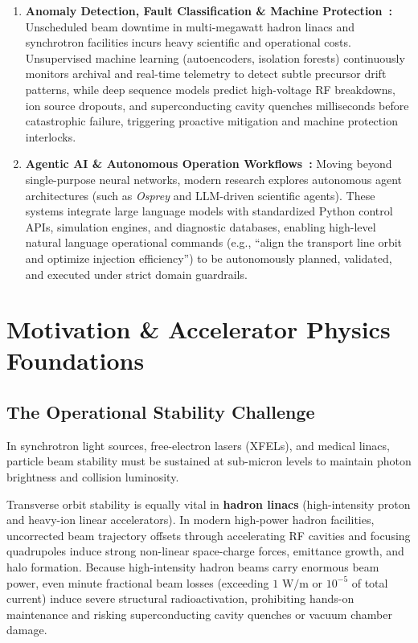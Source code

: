 \documentclass[11pt,a4paper]{article}
\begin{document}
\begin{enumerate}
    \item \textbf{Anomaly Detection, Fault Classification \& Machine Protection~\cite{tennant2020supervised}:}
    Unscheduled beam downtime in multi-megawatt hadron linacs and synchrotron facilities incurs heavy scientific and operational costs. Unsupervised machine learning (autoencoders, isolation forests) continuously monitors archival and real-time telemetry to detect subtle precursor drift patterns, while deep sequence models predict high-voltage RF breakdowns, ion source dropouts, and superconducting cavity quenches milliseconds before catastrophic failure, triggering proactive mitigation and machine protection interlocks.

    \item \textbf{Agentic AI \& Autonomous Operation Workflows~\cite{hellert2024autonomous}:}
    Moving beyond single-purpose neural networks, modern research explores autonomous agent architectures (such as \textit{Osprey} and LLM-driven scientific agents). These systems integrate large language models with standardized Python control APIs, simulation engines, and diagnostic databases, enabling high-level natural language operational commands (e.g., ``align the transport line orbit and optimize injection efficiency'') to be autonomously planned, validated, and executed under strict domain guardrails.
\end{enumerate}


\section{Motivation \& Accelerator Physics Foundations}

\subsection{The Operational Stability Challenge}
In synchrotron light sources, free-electron lasers (XFELs), and medical linacs, particle beam stability must be sustained at sub-micron levels to maintain photon brightness and collision luminosity. 

Transverse orbit stability is equally vital in \textbf{hadron linacs} (high-intensity proton and heavy-ion linear accelerators). In modern high-power hadron facilities, uncorrected beam trajectory offsets through accelerating RF cavities and focusing quadrupoles induce strong non-linear space-charge forces, emittance growth, and halo formation. Because high-intensity hadron beams carry enormous beam power, even minute fractional beam losses (exceeding $1\text{ W/m}$ or $10^{-5}$ of total current) induce severe structural radioactivation, prohibiting hands-on maintenance and risking superconducting cavity quenches or vacuum chamber damage.
\end{document}
